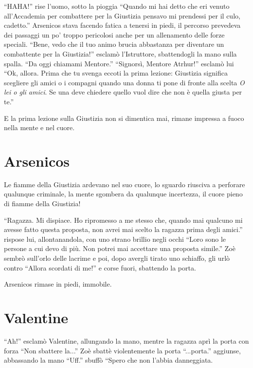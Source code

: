    ``HAHA!'' rise l'uomo, sotto la pioggia ``Quando mi hai detto che eri venuto all'Accademia per combattere per la
    Giustizia pensavo mi prendessi per il culo, cadetto.'' Arsenicos stava facendo fatica a tenersi in piedi, il
    percorso prevedeva dei passaggi un po' troppo pericolosi anche per un allenamento delle forze speciali. ``Bene, vedo
    che il tuo animo brucia abbastanza per diventare un combattente per la Giustizia!'' esclamò l'Istruttore,
    sbattendogli la mano sulla spalla. ``Da oggi chiamami Mentore.'' ``Signorsì, Mentore Atrhur!'' esclamò lui ``Ok, allora.
    Prima che tu svenga eccoti la prima lezione: Giustizia significa scegliere gli amici o i compagni quando una donna
    ti pone di fronte alla scelta \emph{O lei o gli amici}. Se una deve chiedere quello vuol dire che non è quella
    giusta per te.''

    E la prima lezione sulla Giustizia non si dimentica mai, rimane impressa a fuoco nella mente e nel cuore.

  \section*{Arsenicos}

    Le fiamme della Giustizia ardevano nel suo cuore, lo sguardo riusciva a perforare qualunque criminale, la mente
    sgombera da qualunque incertezza, il cuore pieno di fiamme della Giustizia!

    ``Ragazza. Mi dispiace. Ho ripromesso a me stesso che, quando mai qualcuno mi avesse fatto questa proposta, non
    avrei mai scelto la ragazza prima degli amici.'' rispose lui, allontanandola, con uno strano brillio negli occhi
    ``Loro sono le persone a cui devo di più. Non potrei mai accettare una proposta simile.'' Zoè sembrò sull'orlo delle
    lacrime e poi, dopo avergli tirato uno schiaffo, gli urlò contro ``Allora scordati di me!'' e corse fuori, sbattendo
    la porta.

    Arsenicos rimase in piedi, immobile.

  \section*{Valentine}
    
    ``Ah!'' esclamò Valentine, allungando la mano, mentre la ragazza aprì la porta con forza ``Non sbattere la...'' Zoè
    sbattè violentemente la porta ``...porta.'' aggiunse, abbassando la mano ``Uff.'' sbuffò ``Spero che non l'abbia
    danneggiata.


